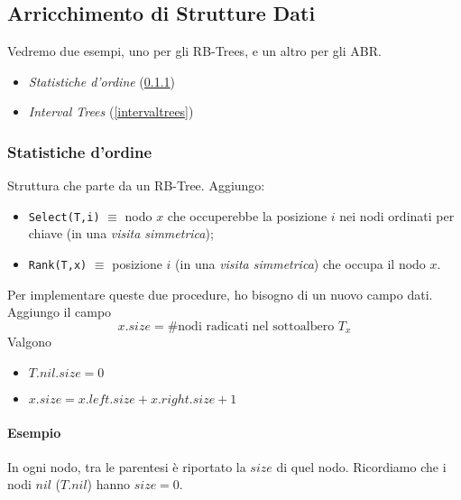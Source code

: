 \subsection{Arricchimento di Strutture Dati}

Vedremo due esempi, uno per gli RB-Trees, e un altro per gli ABR.
\begin{itemize}[noitemsep]
    \item \emph{Statistiche d'ordine} (\ref{statistichedordine})
    \item \emph{Interval Trees} (\ref{intervaltrees})
\end{itemize}

\subsubsection{Statistiche d'ordine} \label{statistichedordine}
Struttura che parte da un RB-Tree. Aggiungo:
\begin{itemize}
    \item \texttt{Select(T,i)} $\equiv$ nodo $x$ che occuperebbe la posizione $i$
        nei nodi ordinati per chiave (in una \emph{visita simmetrica});
    \item \texttt{Rank(T,x)} $\equiv$ posizione $i$ (in una \emph{visita simmetrica}) 
        che occupa il nodo $x$. 
\end{itemize}

Per implementare queste due procedure, ho bisogno di un nuovo campo dati. 
Aggiungo il campo 
$$x.size = \# \text{nodi radicati nel sottoalbero } T_x$$ 
Valgono
\begin{itemize}[label=,noitemsep]
    \item $T.nil.size = 0$
    \item $x.size = x.left.size + x.right.size + 1$
\end{itemize}

\paragraph{Esempio} In ogni nodo, tra le parentesi
è riportato la $size$ di quel nodo. Ricordiamo che i nodi $nil$ ($T.nil$)
hanno $size = 0$.

\begin{center}
\end{center}

